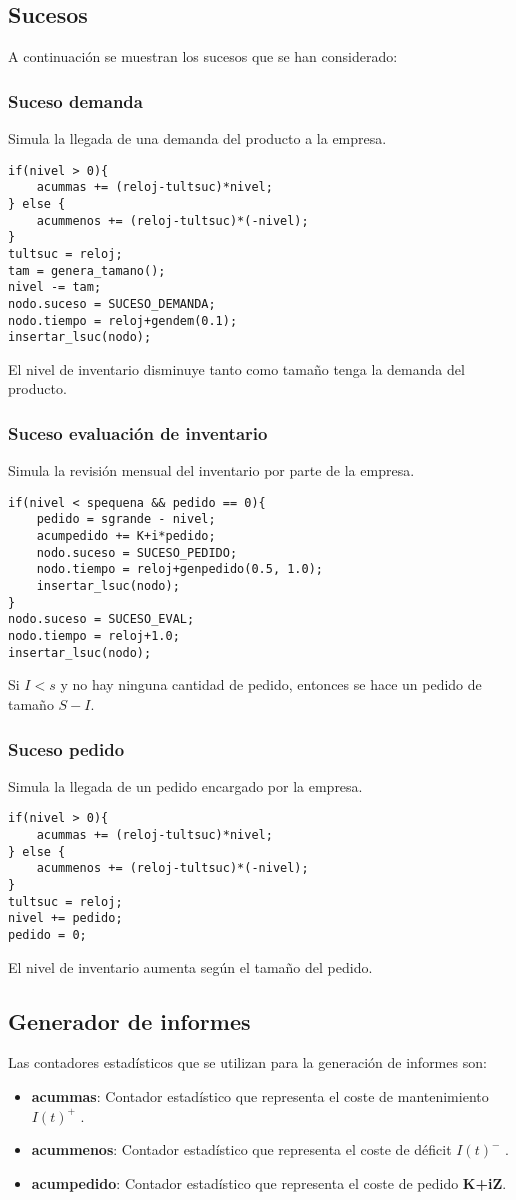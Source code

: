 \subsection{Sucesos}
A continuación se muestran los sucesos que se han considerado:
\subsubsection{Suceso demanda}
Simula la llegada de una demanda del producto a la empresa.
\begin{verbatim}
if(nivel > 0){
	acummas += (reloj-tultsuc)*nivel;
} else {
	acummenos += (reloj-tultsuc)*(-nivel);
}
tultsuc = reloj;
tam = genera_tamano();
nivel -= tam;
nodo.suceso = SUCESO_DEMANDA;
nodo.tiempo = reloj+gendem(0.1);
insertar_lsuc(nodo);
\end{verbatim}
El nivel de inventario disminuye tanto como tamaño tenga la demanda del producto.

\subsubsection{Suceso evaluación de inventario}
Simula la revisión mensual del inventario por parte de la empresa.
\begin{verbatim}
if(nivel < spequena && pedido == 0){
	pedido = sgrande - nivel;
	acumpedido += K+i*pedido;
	nodo.suceso = SUCESO_PEDIDO;
	nodo.tiempo = reloj+genpedido(0.5, 1.0);
	insertar_lsuc(nodo);
}
nodo.suceso = SUCESO_EVAL;
nodo.tiempo = reloj+1.0;
insertar_lsuc(nodo);
\end{verbatim}

Si $I < s$ y no hay ninguna cantidad de pedido, entonces se hace un pedido de tamaño $S - I$.

\subsubsection{Suceso pedido}
Simula la llegada de un pedido encargado por la empresa.
\begin{verbatim}
if(nivel > 0){
	acummas += (reloj-tultsuc)*nivel;
} else {
	acummenos += (reloj-tultsuc)*(-nivel);
}
tultsuc = reloj;
nivel += pedido;
pedido = 0;
\end{verbatim}
El nivel de inventario aumenta según el tamaño del pedido.

\subsection{Generador de informes}
Las contadores estadísticos que se utilizan para la generación de informes son:
\begin{itemize}
	\item \textbf{acummas}: Contador estadístico que representa el coste de mantenimiento \textbf{ $I(t)^+$ }.
	\item \textbf{acummenos}: Contador estadístico que representa el coste de déficit \textbf{ $I(t)^-$ }.
	\item \textbf{acumpedido}: Contador estadístico que representa el coste de pedido \textbf{K+iZ}.
\end{itemize}

